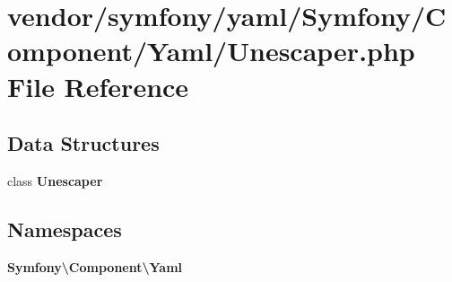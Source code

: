 \section{vendor/symfony/yaml/\+Symfony/\+Component/\+Yaml/\+Unescaper.php File Reference}
\label{_unescaper_8php}
\subsection*{Data Structures}
\begin{DoxyCompactItemize}
\item 
class {\bf Unescaper}
\end{DoxyCompactItemize}
\subsection*{Namespaces}
\begin{DoxyCompactItemize}
\item 
 {\bf Symfony\textbackslash{}\+Component\textbackslash{}\+Yaml}
\end{DoxyCompactItemize}
